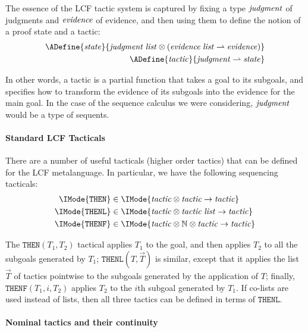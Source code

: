 The essence of the LCF tactic system is captured by fixing a type
$\mathit{judgment}$ of judgments and $\mathit{evidence}$ of evidence, and then using them
to define the notion of a proof state and a tactic:
\begin{align*}
  \ADefine{
    \LCFState
  }{
    \MLList{\LCFJudgment} \otimes (\PartialFun{\MLList{\LCFEvidence}}{\LCFEvidence})
  }\\
  \ADefine{
    \LCFTactic
  }{
    \PartialFun{\LCFJudgment}{\LCFState}
  }
\end{align*}

In other words, a tactic is a partial function that takes a goal to its
subgoals, and specifies how to transform the evidence of its subgoals into the
evidence for the main goal. In the case of the sequence calculus we were
considering, $\mathit{judgment}$ would be a type of sequents.

\paragraph{Standard LCF Tacticals}
There are a number of useful tacticals (higher order tactics) that can be
defined for the LCF metalanguage. In particular, we have the following
sequencing tacticals:
\begin{align*}
  \IMode{\mathtt{THEN}} &\in \IMode{\LCFTactic \otimes \LCFTactic \to \LCFTactic}\\
  \IMode{\mathtt{THENL}} &\in \IMode{\LCFTactic \otimes \MLList{\LCFTactic} \to \LCFTactic}\\
  \IMode{\mathtt{THENF}} &\in \IMode{\LCFTactic \otimes \MLNat \otimes \LCFTactic \to \LCFTactic}\\
\end{align*}

The $\mathtt{THEN}(T_1,T_2)$ tactical applies $T_1$ to the goal, and then
applies $T_2$ to all the subgoals generated by $T_1$;
$\mathtt{THENL}(T,\vec{T})$ is similar, except that it applies the list
$\vec{T}$ of tactics pointwise to the subgoals generated by the application of
$T$; finally, $\mathtt{THENF}(T_1, i, T_2)$ applies $T_2$ to the $i$th subgoal
generated by $T_1$. If co-lists are used instead of lists, then all three
tactics can be defined in terms of $\mathtt{THENL}$.

\paragraph{Nominal tactics and their continuity}


\newcommand\KleeneEq[2]{\IMode{#1}\approx \IMode{#2}}
\newcommand\ModC[1]{\mathsf{M}(#1)}

